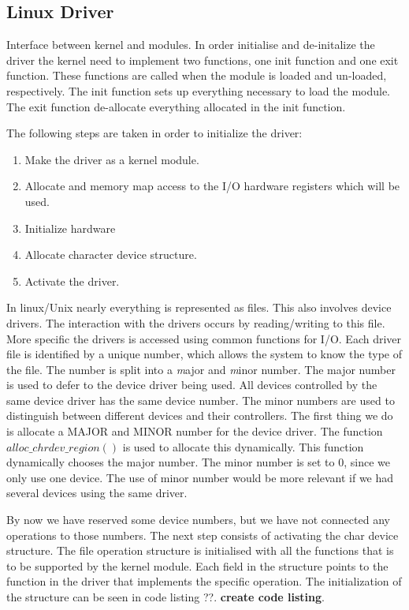 \subsection{Linux Driver}
Interface between kernel and modules. In order initialise and de-initalize the driver the kernel need to implement two functions, one init function and one exit function. These functions are called when the module is loaded and un-loaded, respectively. The init function sets up everything necessary to load the module. The exit function de-allocate everything allocated in the init function. 

The following steps are taken in order to initialize the driver:

\begin{enumerate}
    \item Make the driver as a kernel module.
    \item Allocate and memory map access to the I/O hardware registers which will be used. 
    \item Initialize hardware
    \item Allocate character device structure. 
    \item Activate the driver.
\end{enumerate}

In linux/Unix nearly everything is represented as files. This also involves device drivers. The interaction with the drivers occurs by reading/writing to this file. More specific the drivers is accessed  using common functions for I/O. Each driver file is identified by a unique number, which allows the system to know the type of the file. The number is split into a \emph major and \emph minor number. The major number is used to defer to the device driver being used. All devices controlled by the same device driver has the same device number. The minor numbers are used to distinguish between different devices and their controllers. The first thing we do is allocate a MAJOR and MINOR number for the device driver. The function $alloc\_chrdev\_region()$ is used to allocate this dynamically. This function dynamically chooses the major number. The minor number is set to 0, since we only use one device. The use of minor number would be more relevant if we had several devices using the same driver. 

By now we have reserved some device numbers, but we have not connected any operations to those numbers. The next step consists of activating the char device structure. The file operation structure is initialised with all the functions that is to be supported by the kernel module. Each field in the structure points to the function in the driver that implements the specific operation. The initialization of the structure can be seen in code listing ??. {\bf create code listing}.

